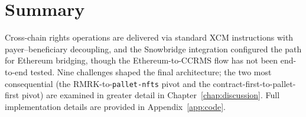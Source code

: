 \section{Summary}\label{sec:chapter-5-summary}

Cross-chain rights operations are delivered via standard XCM instructions with payer--beneficiary decoupling, and the Snowbridge integration configured the path for Ethereum bridging, though the Ethereum-to-CCRMS flow has not been end-to-end tested. Nine challenges shaped the final architecture; the two most consequential (the RMRK-to-\texttt{pallet-nfts} pivot and the contract-first-to-pallet-first pivot) are examined in greater detail in Chapter~\ref{chap:discussion}. Full implementation details are provided in Appendix~\ref{app:code}.
